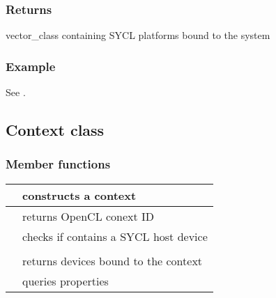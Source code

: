 \documentclass[letterpaper,10pt,english]{sphinxmanual}
\begin{document}
\subsubsection*{Returns}

vector\_class containing SYCL platforms bound to the system
\subsubsection*{Example}

See {\hyperref[\detokenize{programming-interface/runtime/platform:platform-example}]{}}.


\subsection{Context class}
\label{\detokenize{programming-interface/runtime/context:context-class}}\label{\detokenize{programming-interface/runtime/context::doc}}
\begin{sphinxVerbatim}[commandchars=\\\{\}]
 
\end{sphinxVerbatim}
\subsubsection*{Member functions}


\begin{savenotes}\sphinxattablestart
\centering
\begin{tabulary}{\linewidth}[t]{|T|T|}
\hline

{\hyperref[\detokenize{programming-interface/runtime/context:constructor}]{}}
&
constructs a context
\\
\hline
{\hyperref[\detokenize{programming-interface/runtime/context:get}]{}}
&
returns OpenCL conext ID
\\
\hline
{\hyperref[\detokenize{programming-interface/runtime/context:is-host}]{}}
&
checks if contains a SYCL host device
\\
\hline
{\hyperref[\detokenize{programming-interface/runtime/context:get-platform}]{}}
&\\
\hline
{\hyperref[\detokenize{programming-interface/runtime/context:get-devices}]{}}
&
returns devices bound to the context
\\
\hline
{\hyperref[\detokenize{programming-interface/runtime/context:get-info}]{}}
&
queries properties
\\
\hline
\end{tabulary}
\par
\sphinxattableend\end{savenotes}
\end{document}
